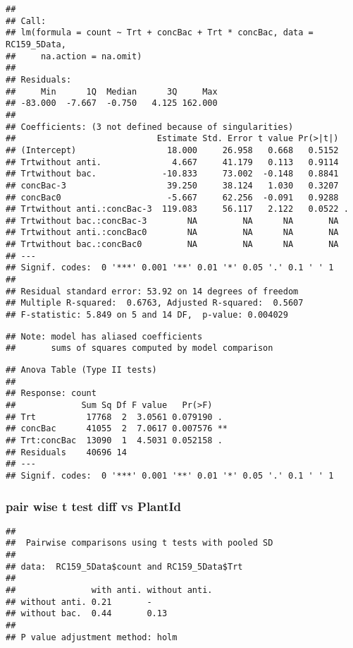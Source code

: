 \documentclass[
]{article}
\begin{document}
\begin{verbatim}
## 
## Call:
## lm(formula = count ~ Trt + concBac + Trt * concBac, data = RC159_5Data, 
##     na.action = na.omit)
## 
## Residuals:
##     Min      1Q  Median      3Q     Max 
## -83.000  -7.667  -0.750   4.125 162.000 
## 
## Coefficients: (3 not defined because of singularities)
##                            Estimate Std. Error t value Pr(>|t|)  
## (Intercept)                  18.000     26.958   0.668   0.5152  
## Trtwithout anti.              4.667     41.179   0.113   0.9114  
## Trtwithout bac.             -10.833     73.002  -0.148   0.8841  
## concBac-3                    39.250     38.124   1.030   0.3207  
## concBac0                     -5.667     62.256  -0.091   0.9288  
## Trtwithout anti.:concBac-3  119.083     56.117   2.122   0.0522 .
## Trtwithout bac.:concBac-3        NA         NA      NA       NA  
## Trtwithout anti.:concBac0        NA         NA      NA       NA  
## Trtwithout bac.:concBac0         NA         NA      NA       NA  
## ---
## Signif. codes:  0 '***' 0.001 '**' 0.01 '*' 0.05 '.' 0.1 ' ' 1
## 
## Residual standard error: 53.92 on 14 degrees of freedom
## Multiple R-squared:  0.6763, Adjusted R-squared:  0.5607 
## F-statistic: 5.849 on 5 and 14 DF,  p-value: 0.004029
\end{verbatim}

\begin{verbatim}
## Note: model has aliased coefficients
##       sums of squares computed by model comparison
\end{verbatim}

\begin{verbatim}
## Anova Table (Type II tests)
## 
## Response: count
##             Sum Sq Df F value   Pr(>F)   
## Trt          17768  2  3.0561 0.079190 . 
## concBac      41055  2  7.0617 0.007576 **
## Trt:concBac  13090  1  4.5031 0.052158 . 
## Residuals    40696 14                    
## ---
## Signif. codes:  0 '***' 0.001 '**' 0.01 '*' 0.05 '.' 0.1 ' ' 1
\end{verbatim}

\hypertarget{pair-wise-t-test-diff-vs-plantid}{%
\subsubsection{pair wise t test diff vs
PlantId}\label{pair-wise-t-test-diff-vs-plantid}}

\begin{verbatim}
## 
##  Pairwise comparisons using t tests with pooled SD 
## 
## data:  RC159_5Data$count and RC159_5Data$Trt 
## 
##               with anti. without anti.
## without anti. 0.21       -            
## without bac.  0.44       0.13         
## 
## P value adjustment method: holm
\end{verbatim}
\end{document}
